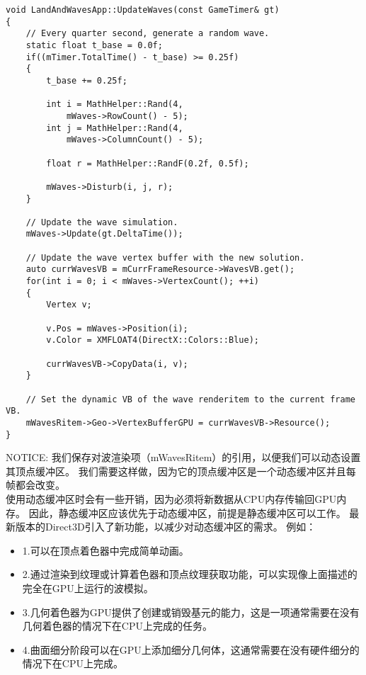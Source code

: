 \begin{lstlisting}
void LandAndWavesApp::UpdateWaves(const GameTimer& gt)
{
	// Every quarter second, generate a random wave.
	static float t_base = 0.0f;
	if((mTimer.TotalTime() - t_base) >= 0.25f)
	{
		t_base += 0.25f;

		int i = MathHelper::Rand(4, 
            mWaves->RowCount() - 5);
		int j = MathHelper::Rand(4,
            mWaves->ColumnCount() - 5);

		float r = MathHelper::RandF(0.2f, 0.5f);

		mWaves->Disturb(i, j, r);
	}

	// Update the wave simulation.
	mWaves->Update(gt.DeltaTime());

	// Update the wave vertex buffer with the new solution.
	auto currWavesVB = mCurrFrameResource->WavesVB.get();
	for(int i = 0; i < mWaves->VertexCount(); ++i)
	{
		Vertex v;

		v.Pos = mWaves->Position(i);
        v.Color = XMFLOAT4(DirectX::Colors::Blue);

		currWavesVB->CopyData(i, v);
	}

	// Set the dynamic VB of the wave renderitem to the current frame VB.
	mWavesRitem->Geo->VertexBufferGPU = currWavesVB->Resource();
}
\end{lstlisting}

\begin{flushleft}
NOTICE: 我们保存对波渲染项（mWavesRitem）的引用，以便我们可以动态设置其顶点缓冲区。 我们需要这样做，因为它的顶点缓冲区是一个动态缓冲区并且每帧都会改变。\\

使用动态缓冲区时会有一些开销，因为必须将新数据从CPU内存传输回GPU内存。 因此，静态缓冲区应该优先于动态缓冲区，前提是静态缓冲区可以工作。 最新版本的Direct3D引入了新功能，以减少对动态缓冲区的需求。 例如：\\
\end{flushleft}

\begin{itemize}
  \item 1.可以在顶点着色器中完成简单动画。
  \item 2.通过渲染到纹理或计算着色器和顶点纹理获取功能，可以实现像上面描述的完全在GPU上运行的波模拟。
  \item 3.几何着色器为GPU提供了创建或销毁基元的能力，这是一项通常需要在没有几何着色器的情况下在CPU上完成的任务。
  \item 4.曲面细分阶段可以在GPU上添加细分几何体，这通常需要在没有硬件细分的情况下在CPU上完成。
\end{itemize}

